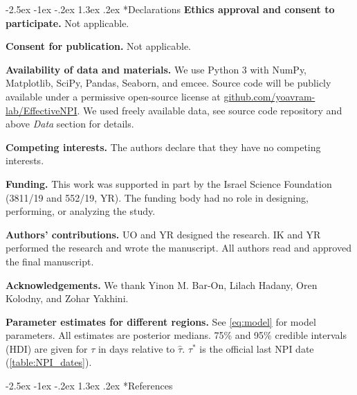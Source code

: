 \documentclass[12pt]{extarticle}
\makeatletter
\renewcommand\section{\@startsection {section}{1}{\z@}%
     {-2.5ex \@plus -1ex \@minus -.2ex}%
     {1.3ex \@plus.2ex}%
    {\Large\bfseries}}
\makeatother
\begin{document}
{\small
\section*{Declarations}
\textbf{Ethics approval and consent to participate.} Not applicable.

\textbf{Consent for publication.} Not applicable.

\textbf{Availability of data and materials.} We use Python 3 with NumPy, Matplotlib, SciPy, Pandas, Seaborn, and emcee.
Source code will be publicly available under a permissive open-source license at \href{http://github.com/yoavram-lab/EffectiveNPI}{github.com/yoavram-lab/EffectiveNPI}.
We used freely available data, see source code repository and above \emph{Data} section for details.

\textbf{Competing interests.} The authors declare that they have no competing interests.

\textbf{Funding.} This work was supported in part by the Israel Science Foundation (3811/19 and 552/19, YR). The funding body had no role in designing, performing, or analyzing the study.

\textbf{Authors' contributions.} UO and YR designed the research. IK and YR performed the research and wrote the manuscript. All authors read and approved the final manuscript.

\textbf{Acknowledgements.} 
We thank Yinon M. Bar-On, Lilach Hadany, Oren Kolodny, and Zohar Yakhini. %
} %

\begin{landscape}
\begin{table}[]
\centering
\footnotesize{

}
\caption{
\textbf{Parameter estimates for different regions.}
See \autoref{eq:model} for model parameters.
All estimates are posterior medians.
75\% and 95\% credible intervals (HDI) are given for $\tau$ in days relative to $\hat{\tau}$.
$\tau^*$ is the official last NPI date (\autoref{table:NPI_dates}).
}
\label{table:estimated-params}
\end{table}
\end{landscape}




\section*{References}
\nolinenumbers

%

\end{document}
